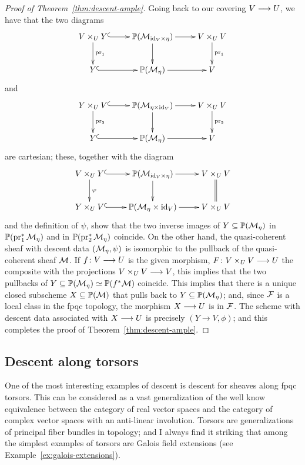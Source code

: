 \begin{4   STACKS}
\begin{4.3 Descent for morphisms of schemes}
\begin{proof}[Proof of Theorem~\ref{thm:descent-ample}]
Going back to our covering $V \arr U$, we have that the two diagrams
   \[
   \xymatrix{
   V\times_{U}Y\ar[d]^{\pr_{1}} \ar@{^(->}[r]
   & {}\PP(\cM_{\id_{V}\times \eta}) \ar[r]\ar[d]
   & V\times_{U}V \ar[d]^{\pr_{1}}
   \\
   Y \ar@{^(->}[r]
   & {}\PP(\cM_{\eta}) \ar[r]
   & V
   }
   \]
and
   \[
   \xymatrix{
   Y\times_{U}V\ar[d]^{\pr_{2}} \ar@{^(->}[r]
   & {}\PP(\cM_{\eta\times\id_{V}}) \ar[r]\ar[d]
   & V\times_{U}V \ar[d]^{\pr_{2}}
   \\
   Y \ar@{^(->}[r]
   & {}\PP(\cM_{\eta}) \ar[r]
   & V
   }
   \]
are cartesian; these, together with the diagram
   \[
   \xymatrix{
   V\times_{U}Y\ar[d]^{\phi} \ar@{^(->}[r]
   & {}\PP(\cM_{\id_{V}\times \eta}) \ar[r]\ar[d]
   & V\times_{U}V \ar@{=}[d]
   \\
   Y\times_{U} V \ar@{^(->}[r]
   & {}\PP(\cM_{\eta}\times\id_{V}) \ar[r]
   & V\times_{U}V
   }
   \]
and the definition of $\psi$, show that the two inverse images of $Y \subseteq \mathbb{P}(\mathcal{M}_{\eta})$ in $\mathbb{P}(\operatorname{pr}_{1}^{*}\mathcal{M}_{\eta})$ and in $\mathbb{P}(\operatorname{pr}_{2}^{*}\mathcal{M}_{\eta})$ coincide. On the other hand, the quasi-coherent sheaf with descent data $(\mathcal{M}_{\eta},\psi)$ is isomorphic to the pullback of the quasi-coherent sheaf $\mathcal{M}$. If $f\colon V \arr U$ is the given morphism, $F\colon V \times_{U} V \arr U$ the composite with the projections $V\times_{U}V \arr V$, this implies that the two pullbacks of $Y \subseteq \mathbb{P}(\mathcal{M}_{\eta}) \simeq \mathbb{P}(f^{*}\mathcal{M})$ coincide. This implies that there is a unique closed subscheme $X \subseteq \mathbb{P}(\mathcal{M})$ that pulls back to $Y \subseteq \mathbb{P}(\mathcal{M}_{\eta})$; and, since $\mathcal{F}$ is a local class in the fpqc topology, the morphism $X \arr U$ is in $\mathcal{F}$. The scheme with descent data associated with $X \arr U$ is precisely $(Y \to V, \phi)$; and this completes the proof of Theorem~\ref{thm:descent-ample}.
\end{proof}



\end{4.3 Descent for morphisms of schemes}
\begin{4.4 Descent along torsors}
\setcounter{section}{3}
\section{Descent along torsors}
\setcounter{theorem}{41}
One of the most interesting examples of descent is descent for \qc sheaves along fpqc torsors. This can be considered as a vast generalization of the well know equivalence between the category of real vector spaces and the category of complex vector spaces with an anti-linear involution. Torsors are generalizations of principal fiber bundles in topology; and I always find it striking that among the simplest examples of torsors are Galois field extensions (see Example~\ref{ex:galois-extensions}).


\end{4.4 Descent along torsors}
\end{4   STACKS}
